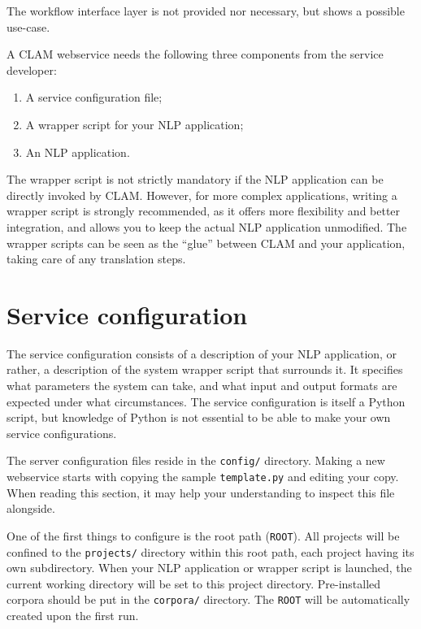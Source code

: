 \documentclass[a4paper,12pt]{report}
\begin{document}
The workflow interface layer is not provided nor necessary, but shows a possible use-case.

A CLAM webservice needs the following three components from the service developer:

\begin{enumerate}
\item A service configuration file;
\item A wrapper script for your NLP application;
\item An NLP application.
\end{enumerate}

The wrapper script is not strictly mandatory if the NLP application can be directly invoked by CLAM. However, for more complex applications, writing a wrapper script is strongly recommended, as it offers more flexibility and better integration, and allows you to keep the actual NLP application unmodified. The wrapper scripts can be seen as the ``glue'' between CLAM and your application, taking care of any translation steps.


\section{Service configuration}
\label{sec:serviceconfig}

The service configuration consists of a description of your NLP application, or rather, a description of the system wrapper script that surrounds it. It specifies what parameters the system can take, and what input and output formats are expected under what circumstances. The service configuration is itself a Python script, but knowledge of Python is not essential to be able to make your own service configurations. 

The server configuration files reside in the \texttt{config/} directory. Making a new webservice starts with copying the sample \texttt{template.py} and editing your copy. When reading this section, it may help your understanding to inspect this file alongside.

One of the first things to configure is the root path (\texttt{ROOT}). All projects will be confined to the \texttt{projects/} directory within this root path, each project having its own subdirectory. When your NLP application or wrapper script is launched, the current working directory will be set to this project directory. Pre-installed corpora should be put in the \texttt{corpora/} directory. The \texttt{ROOT} will be automatically created upon the first run.
\end{document}
